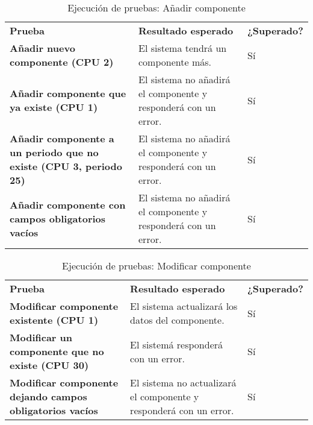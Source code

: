 \begin{table}[H]
\vspace{-4mm}
  \centering
  \caption{Ejecución de pruebas: Añadir componente}
    \begin{tabular}{p{13em}p{18em}p{5em}}
    \toprule
    \rowcolor[rgb]{ .851,  .886,  .953} \multicolumn{3}{p{36em}}{\textbf{Añadir componente}} \\ \midrule
    \rowcolor[rgb]{ .949,  .949,  .949} \textbf{Prueba} & \textbf{Resultado esperado} & \textbf{¿Superado?} \\ \midrule
    \textbf{Añadir nuevo componente (CPU 2)} & El sistema tendrá un componente más.  & Sí  \\ \midrule
    \textbf{Añadir componente que ya existe (CPU 1)} & El sistema no añadirá el componente y responderá con un error.  & Sí  \\ \midrule
    \textbf{Añadir componente a un periodo que no existe (CPU 3, periodo 25)} & El sistema no añadirá el componente y responderá con un error.  & Sí  \\ \midrule
    \textbf{Añadir componente con campos obligatorios vacíos} & El sistema no añadirá el componente y responderá con un error.  & Sí \\ \bottomrule
    \end{tabular}%
\end{table}%
\begin{table}[H]
\vspace{-4mm}
  \centering
  \caption{Ejecución de pruebas: Modificar componente}
    \begin{tabular}{p{13em}p{18em}p{5em}}
    \toprule
    \rowcolor[rgb]{ .851,  .886,  .953} \multicolumn{3}{p{36em}}{\textbf{Modificar componente}} \\ \midrule
    \rowcolor[rgb]{ .949,  .949,  .949} \textbf{Prueba} & \textbf{Resultado esperado} & \textbf{¿Superado?} \\ \midrule
    \textbf{Modificar componente existente (CPU 1)} & El sistema actualizará los datos del componente.  & Sí \\ \midrule
    \textbf{Modificar un componente que no existe (CPU 30)} & El sistemá responderá con un error.  & Sí \\ \midrule
    \textbf{Modificar componente dejando campos obligatorios vacíos} &  El sistema no actualizará el componente y responderá con un error.  & Sí \\ \bottomrule
    \end{tabular}%
\end{table}%
